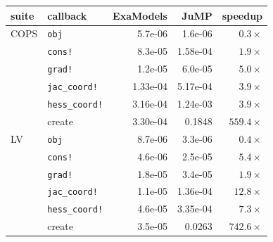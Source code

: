 \begin{tabular}{ll rrr}
  \toprule
  suite & callback & ExaModels & JuMP & speedup \\
  \midrule
  COPS & \texttt{obj} & 5.7e-06 & 1.6e-06 & $0.3\times$ \\
   & \texttt{cons!} & 8.3e-05 & 1.58e-04 & $1.9\times$ \\
   & \texttt{grad!} & 1.2e-05 & 6.0e-05 & $5.0\times$ \\
   & \texttt{jac\_coord!} & 1.33e-04 & 5.17e-04 & $3.9\times$ \\
   & \texttt{hess\_coord!} & 3.16e-04 & 1.24e-03 & $3.9\times$ \\
   & create & 3.30e-04 & 0.1848 & $559.4\times$ \\
  \midrule
  LV & \texttt{obj} & 8.7e-06 & 3.3e-06 & $0.4\times$ \\
   & \texttt{cons!} & 4.6e-06 & 2.5e-05 & $5.4\times$ \\
   & \texttt{grad!} & 1.8e-05 & 3.4e-05 & $1.9\times$ \\
   & \texttt{jac\_coord!} & 1.1e-05 & 1.36e-04 & $12.8\times$ \\
   & \texttt{hess\_coord!} & 4.6e-05 & 3.35e-04 & $7.3\times$ \\
   & create & 3.5e-05 & 0.0263 & $742.6\times$ \\
  \bottomrule
\end{tabular}
